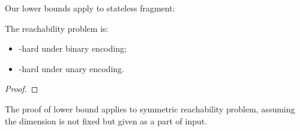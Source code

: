 \documentclass[a4paper,UKenglish,cleveref, autoref, thm-restate,dvipsnames,anonymous]{lipics-v2021}
\begin{document}
Our lower bounds apply to stateless fragment:

\begin{theorem}
The \donevas reachability problem is:
\begin{itemize}
\item \pspace-hard under binary encoding;
\item \np-hard under unary encoding.
\end{itemize}
\end{theorem}
%
\begin{proof}
\end{proof}

\begin{remark}
The proof of \np lower bound applies to symmetric \vas reachability problem,
assuming the dimension is not fixed but given as a part of input.
\end{remark}

\newpage




\end{document}
